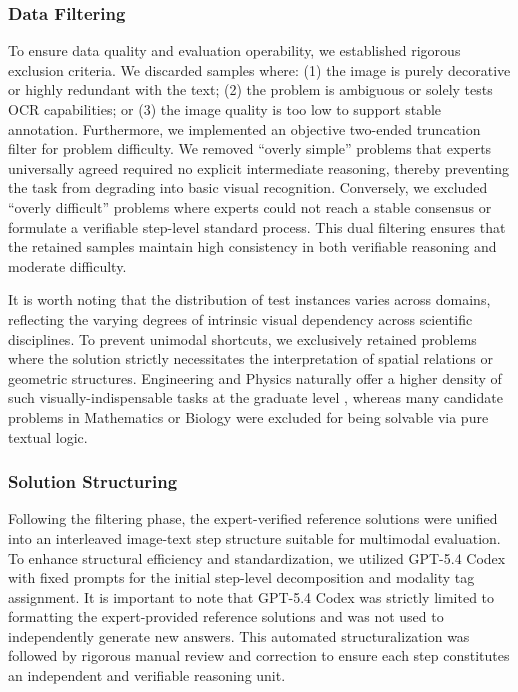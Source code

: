 \documentclass[11pt]{article}
\begin{document}
\subsubsection{\textbf{Data Filtering}}
To ensure data quality and evaluation operability, we established rigorous exclusion criteria. We discarded samples where: (1) the image is purely decorative or highly redundant with the text; (2) the problem is ambiguous or solely tests OCR capabilities; or (3) the image quality is too low to support stable annotation. Furthermore, we implemented an objective two-ended truncation filter for problem difficulty. We removed ``overly simple'' problems that experts universally agreed required no explicit intermediate reasoning, thereby preventing the task from degrading into basic visual recognition. Conversely, we excluded ``overly difficult'' problems where experts could not reach a stable consensus or formulate a verifiable step-level standard process. This dual filtering ensures that the retained samples maintain high consistency in both verifiable reasoning and moderate difficulty.

It is worth noting that the distribution of test instances varies across domains, reflecting the varying degrees of intrinsic visual dependency across scientific disciplines. To prevent unimodal shortcuts, we exclusively retained problems where the solution strictly necessitates the interpretation of spatial relations or geometric structures. Engineering and Physics naturally offer a higher density of such visually-indispensable tasks at the graduate level , whereas many candidate problems in Mathematics or Biology were excluded for being solvable via pure textual logic.





\subsubsection{\textbf{Solution Structuring}}
Following the filtering phase, the expert-verified reference solutions were unified into an interleaved image-text step structure suitable for multimodal evaluation. To enhance structural efficiency and standardization, we utilized GPT-5.4 Codex with fixed prompts for the initial step-level decomposition and modality tag assignment. It is important to note that GPT-5.4 Codex was strictly limited to formatting the expert-provided reference solutions and was not used to independently generate new answers. This automated structuralization was followed by rigorous manual review and correction to ensure each step constitutes an independent and verifiable reasoning unit.
\end{document}
